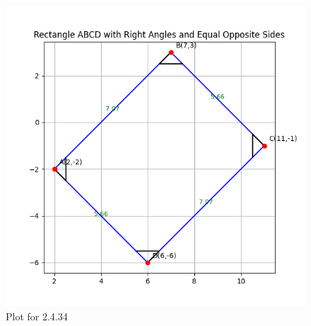 \documentclass[journal,12pt,onecolumn]{IEEEtran}
\theoremstyle{remark}
\begin{document}
\begin{figure}[H]
    \centering
    \includegraphics[width=1\columnwidth]{figs/1.png}
    \caption{Plot for 2.4.34}
    \label{fig:placeholder}
\end{figure}
\end{document}
